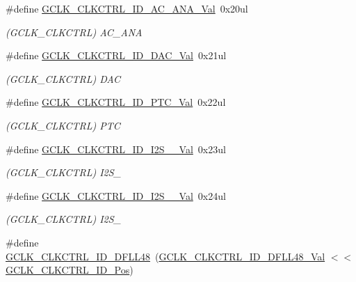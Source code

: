 \begin{DoxyCompactItemize}
\#define \mbox{\hyperlink{group___s_a_m_d21___g_c_l_k_ga5a296324385e4617069890aa675632ff}{G\+C\+L\+K\+\_\+\+C\+L\+K\+C\+T\+R\+L\+\_\+\+I\+D\+\_\+\+A\+C\+\_\+\+A\+N\+A\+\_\+\+Val}}~0x20ul
\begin{DoxyCompactList}\small\item\em (G\+C\+L\+K\+\_\+\+C\+L\+K\+C\+T\+RL) A\+C\+\_\+\+A\+NA \end{DoxyCompactList}\item 
\#define \mbox{\hyperlink{group___s_a_m_d21___g_c_l_k_ga1dc77a3784a3e8021336bbe6a492ebe0}{G\+C\+L\+K\+\_\+\+C\+L\+K\+C\+T\+R\+L\+\_\+\+I\+D\+\_\+\+D\+A\+C\+\_\+\+Val}}~0x21ul
\begin{DoxyCompactList}\small\item\em (G\+C\+L\+K\+\_\+\+C\+L\+K\+C\+T\+RL) D\+AC \end{DoxyCompactList}\item 
\#define \mbox{\hyperlink{group___s_a_m_d21___g_c_l_k_gac44e99202775c88a813b1416a66c7469}{G\+C\+L\+K\+\_\+\+C\+L\+K\+C\+T\+R\+L\+\_\+\+I\+D\+\_\+\+P\+T\+C\+\_\+\+Val}}~0x22ul
\begin{DoxyCompactList}\small\item\em (G\+C\+L\+K\+\_\+\+C\+L\+K\+C\+T\+RL) P\+TC \end{DoxyCompactList}\item 
\#define \mbox{\hyperlink{group___s_a_m_d21___g_c_l_k_ga6f4f283f31ba4afece3ce58302c3eca7}{G\+C\+L\+K\+\_\+\+C\+L\+K\+C\+T\+R\+L\+\_\+\+I\+D\+\_\+\+I2\+S\+\_\+\_\+\+Val}}~0x23ul
\begin{DoxyCompactList}\small\item\em (G\+C\+L\+K\+\_\+\+C\+L\+K\+C\+T\+RL) I2\+S\+\_ \end{DoxyCompactList}\item 
\#define \mbox{\hyperlink{group___s_a_m_d21___g_c_l_k_gab85ca6d48229a8290fe2c5d57e8c2396}{G\+C\+L\+K\+\_\+\+C\+L\+K\+C\+T\+R\+L\+\_\+\+I\+D\+\_\+\+I2\+S\+\_\+\_\+\+Val}}~0x24ul
\begin{DoxyCompactList}\small\item\em (G\+C\+L\+K\+\_\+\+C\+L\+K\+C\+T\+RL) I2\+S\+\_ \end{DoxyCompactList}\item 
\#define \mbox{\hyperlink{group___s_a_m_d21___g_c_l_k_ga2bfe3f168083a5cea3e4d121050f204b}{G\+C\+L\+K\+\_\+\+C\+L\+K\+C\+T\+R\+L\+\_\+\+I\+D\+\_\+\+D\+F\+L\+L48}}~(\mbox{\hyperlink{group___s_a_m_d21___g_c_l_k_gab1b72b8b751c1bd1d0994d731a79ee82}{G\+C\+L\+K\+\_\+\+C\+L\+K\+C\+T\+R\+L\+\_\+\+I\+D\+\_\+\+D\+F\+L\+L48\+\_\+\+Val}}    $<$$<$ \mbox{\hyperlink{group___s_a_m_d21___g_c_l_k_ga882860b306b819b8bb342bebd55c23aa}{G\+C\+L\+K\+\_\+\+C\+L\+K\+C\+T\+R\+L\+\_\+\+I\+D\+\_\+\+Pos}})
$$
\end{DoxyCompactItemize}

